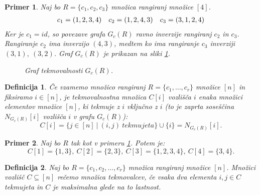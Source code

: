 \documentclass[a4paper, 12pt]{book}
\newtheorem{definicija}{Definicija}[chapter]
\newtheorem{primer}{Primer}[chapter]
\begin{document}
\begin{primer}
\label{primer_tekmovalnostni_graf}
    Naj bo $R = \{ c_1, c_2, c_3 \}$ množica rangiranj množice $[4]$.
    \begin{align*}
        c_1 = (1, 2, 3, 4) \quad c_2 = (1, 2, 4, 3) \quad c_3 = (3, 1, 2, 4) \notag
    \end{align*}
    Ker je $c_1=id$, so povezave grafa $G_c(R)$ ravno inverzije rangiranj $c_2$ in $c_3$. Rangiranje $c_2$ ima inverzijo $(4, 3)$, medtem ko ima rangiranje $c_3$ inverziji $(3, 1), \ (3, 2)$. Graf $G_c(R)$ je prikazan na sliki \ref{graf_tekmovalnosti_primer}.
    \begin{figure}[h]
        \begin{center}
        \end{center}
        \caption{Graf tekmovalnosti $G_c(R)$.}
        \label{graf_tekmovalnosti_primer}
    \end{figure}
\end{primer}


\begin{definicija}
    Če vzamemo množico rangiranj $R = \{ c_1, \dots, c_r \}$ množice $[n]$ in fiksiramo $i \in [n]$, je tekmovalnostna množica $C[i]$ vozlišča $i$ enaka množici elementov množice $[n]$, ki tekmuje z $i$ vključno z $i$ (to je zaprta soseščina $N_{G_c(R)}[i]$ vozlišča $i$ v grafu $G_c(R)$):
    \[
        C[i] = \{ j \in [n] \ | \ (i, j) \ tekmujeta \} \cup \{ i \} = N_{G_c(R)}[i].
    \]
\end{definicija}

\begin{primer}
    Naj bo $R$ tak kot v primeru \ref{primer_tekmovalnostni_graf}. Potem je:
    \[
        C[1] = \{ 1, 3 \}, \ C[2] = \{ 2, 3 \}, \ C[3] = \{ 1, 2, 3, 4 \}, \ C[4] = \{ 3, 4 \}.
    \]
\end{primer}

\begin{definicija}
    Naj bo $R = \{ c_1, c_2, \dots, c_r\}$ množica rangiranj množice $[n]$. Množici  vozlišč $C \subseteq [n]$ rečemo množica tekmovalcev, če vsaka dva elementa $i, j \in C$ tekmujeta in $C$ je maksimalna glede na to lastnost.
\end{definicija}
\end{document}
